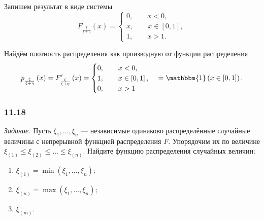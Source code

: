 Запишем результат в виде системы
$$F_{ \frac{ \xi }{ \xi + \eta }} \left( x \right) =
\begin{cases}
0, \qquad x < 0, \\
x, \qquad x \in \left[ 0, 1 \right], \\
1, \qquad x > 1.
\end{cases}$$

Найдём плотность распределения как производную от функции распределения
$$p_{ \frac{ \xi }{ \xi + \eta }} \left( x \right) =
F'_{ \frac{ \xi }{ \xi + \eta }} \left( x \right) =
\begin{cases}
0, \qquad x < 0, \\
1, \qquad x \in \left[ 0, 1 \right], \\
0, \qquad x > 1
\end{cases} =
\mathbbm{1} \left( x \in \left[ 0, 1 \right] \right).$$

\subsubsection*{11.18}

\textit{Задание.} Пусть $ \xi_1, \dotsc, \xi_n$ --- независимые одинаково распределённые случайные величины с непрерывной функцией распределения $F$.
Упорядочим их по величине $ \xi_{ \left( 1 \right) } \leq \xi_{ \left( 2 \right) } \leq \dotsc \leq \xi_{ \left( n \right) }$.
Найдите функцию распределения случайных величин:
\begin{enumerate}[label=\alph*)]
\item $ \xi_{ \left( 1 \right) } = \min \left( \xi_1, \dotsc, \xi_n \right) $;
\item $ \xi_{ \left( n \right) } = \max \left( \xi_1, \dotsc, \xi_n \right) $;
\item $ \xi_{ \left( m \right) }$.
\end{enumerate}

